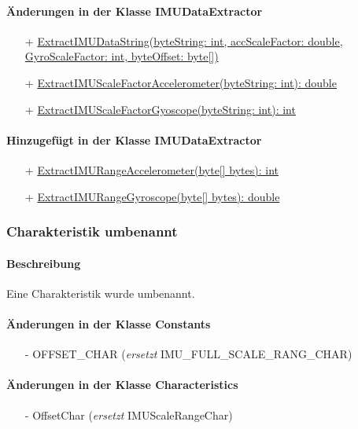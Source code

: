 \documentclass[a4paper,12pt]{article}
\begin{document}
\paragraph{Änderungen in der Klasse IMUDataExtractor}
\begin{itemize}
  \item[+] \underline{ExtractIMUDataString(byteString: int, accScaleFactor: double,} \\
  \underline{GyroScaleFactor: int, byteOffset: byte[])} 
	\item[+] \underline{ExtractIMUScaleFactorAccelerometer(byteString: int): double}
	\item[+] \underline{ExtractIMUScaleFactorGyoscope(byteString: int): int}
\end{itemize}
\paragraph{Hinzugefügt in der Klasse IMUDataExtractor}
\begin{itemize}
  \item[+] \underline{ExtractIMURangeAccelerometer(byte[] bytes): int} 
	\item[+] \underline{ExtractIMURangeGyroscope(byte[] bytes): double} 
\end{itemize}
\subsubsection{Charakteristik umbenannt}
\paragraph{Beschreibung}
Eine Charakteristik wurde umbenannt.
\paragraph{Änderungen in der Klasse Constants}
\begin{itemize}
	\item[-] OFFSET\_CHAR (\textit{ersetzt}  IMU\_FULL\_SCALE\_RANG\_CHAR) %
\end{itemize}
\paragraph{Änderungen in der Klasse Characteristics}
\begin{itemize}
	\item[-] OffsetChar (\textit{ersetzt} IMUScaleRangeChar) %
\end{itemize}
\end{document}
